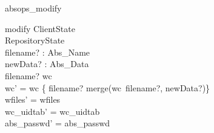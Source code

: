 \begin{doc}{absops_modify}
  \begin{schema}{modify}
    \Delta ClientState \\
    \Xi RepositoryState  \\
    filename? : Abs\_Name \\
    newData? : Abs\_Data \\
    \where 
    filename? \in \dom wc\\
    wc' = wc \oplus\{ filename? \mapsto merge(wc~filename?, newData?)\} \\
    wfiles' = wfiles \\
    wc\_uidtab' = wc\_uidtab \\
    abs\_passwd' = abs\_passwd \\
  \end{schema}
\end{doc}

